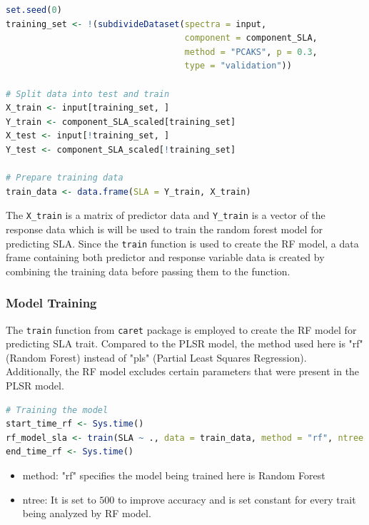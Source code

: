 \documentclass[12pt,a4paper]{report}
\begin{document}
\begin{lstlisting}[language=R, style=mystyle]
set.seed(0)
training_set <- !(subdivideDataset(spectra = input,
                                   component = component_SLA,
                                   method = "PCAKS", p = 0.3,
                                   type = "validation"))

# Split data into test and train
X_train <- input[training_set, ]
Y_train <- component_SLA_scaled[training_set]
X_test <- input[!training_set, ]
Y_test <- component_SLA_scaled[!training_set]

# Prepare training data
train_data <- data.frame(SLA = Y_train, X_train)
\end{lstlisting}

The \texttt{X\_train} is a matrix of predictor data and \texttt{Y\_train} is a vector of the response data which is will be used to train the random forest model for predicting SLA. Since the \texttt{train} function is used to create the RF model, a data frame containing both predictor and response variable data is created by combining the training data before passing them to the function. \\

\subsubsection*{Model Training}
The \texttt{train} function from \texttt{caret} package is employed to create the RF model for predicting SLA trait. Compared to the PLSR model, the method used here is "rf" (Random Forest) instead of "pls" (Partial Least Squares Regression). Additionally, the RF model excludes certain parameters that were present in the PLSR model. \\

\begin{lstlisting}[language=R, style=mystyle]
# Training the model
start_time_rf <- Sys.time()
rf_model_sla <- train(SLA ~ ., data = train_data, method = "rf", ntree = 500)
end_time_rf <- Sys.time()
\end{lstlisting}

\begin{itemize}
    \item method: "rf" specifies the model being trained here is Random Forest
    \item ntree: It is set to $500$ to improve accuracy and is set constant for every trait being analyzed by RF model.
\end{itemize}
\end{document}
